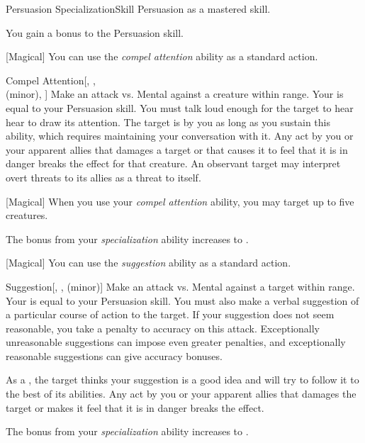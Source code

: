     \begin{feat}{Persuasion Specialization}{Skill}
        \featpre Persuasion as a mastered skill.

         You gain a  bonus to the Persuasion skill.

        [Magical] You can use the \textit{compel attention} ability as a standard action.
        \begin{apability}{Compel Attention}[, ,\\ (minor), ]
            Make an attack vs. Mental against a creature within \rngmed range.
            Your  is equal to your Persuasion skill.
            You must talk loud enough for the target to hear hear to draw its attention.
            \hit The target is  by you as long as you sustain this ability, which requires maintaining your conversation with it.
            Any act by you or your apparent allies that damages a target or that causes it to feel that it is in danger breaks the effect for that creature.
            An observant target may interpret overt threats to its allies as a threat to itself.
        \end{apability}

        [Magical] When you use your \textit{compel attention} ability, you may target up to five creatures.

         The bonus from your \textit{specialization} ability increases to .

        [Magical] You can use the \textit{suggestion} ability as a standard action.
        \begin{apability}{Suggestion}[, ,  (minor)]
            Make an attack vs. Mental against a target within \rngmed range.
            Your  is equal to your Persuasion skill.
            You must also make a verbal suggestion of a particular course of action to the target.
            If your suggestion does not seem reasonable, you take a  penalty to accuracy on this attack.
            Exceptionally unreasonable suggestions can impose even greater penalties, and exceptionally reasonable suggestions can give accuracy bonuses.

            \hit As a , the target thinks your suggestion is a good idea and will try to follow it to the best of its abilities.
            Any act by you or your apparent allies that damages the target or makes it feel that it is in danger breaks the effect.

        \end{apability}

         The bonus from your \textit{specialization} ability increases to .
    \end{feat}

